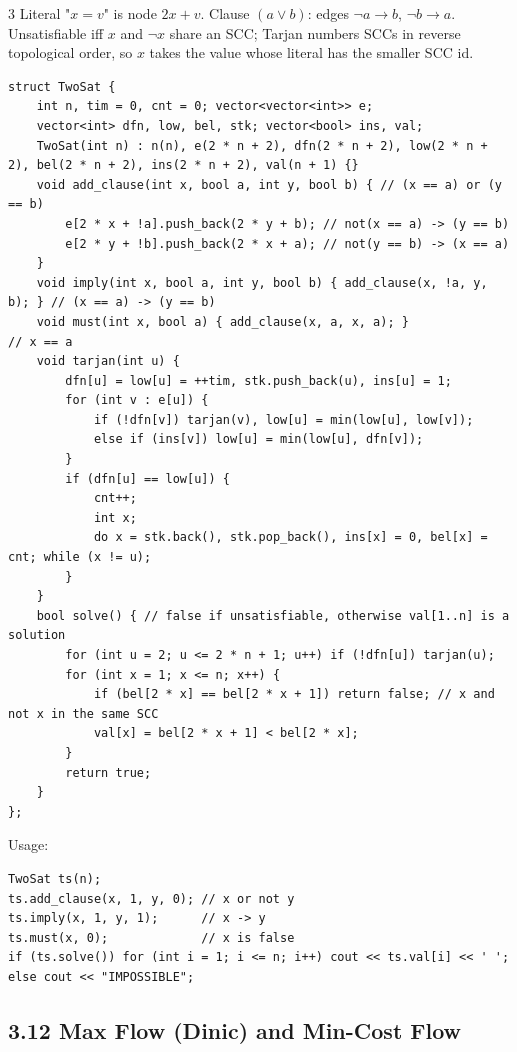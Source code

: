 \documentclass[8pt]{extarticle}
\begin{document}
\begin{multicols*}{3}
Literal "$x = v$" is node $2x + v$. Clause $(a \lor b)$: edges $\neg a \to b$, $\neg b \to a$. Unsatisfiable iff $x$ and $\neg x$ share an SCC; Tarjan numbers SCCs in reverse topological order, so $x$ takes the value whose literal has the smaller SCC id.

\begin{lstlisting}
struct TwoSat {
    int n, tim = 0, cnt = 0; vector<vector<int>> e;
    vector<int> dfn, low, bel, stk; vector<bool> ins, val;
    TwoSat(int n) : n(n), e(2 * n + 2), dfn(2 * n + 2), low(2 * n + 2), bel(2 * n + 2), ins(2 * n + 2), val(n + 1) {}
    void add_clause(int x, bool a, int y, bool b) { // (x == a) or (y == b)
        e[2 * x + !a].push_back(2 * y + b); // not(x == a) -> (y == b)
        e[2 * y + !b].push_back(2 * x + a); // not(y == b) -> (x == a)
    }
    void imply(int x, bool a, int y, bool b) { add_clause(x, !a, y, b); } // (x == a) -> (y == b)
    void must(int x, bool a) { add_clause(x, a, x, a); }                  // x == a
    void tarjan(int u) {
        dfn[u] = low[u] = ++tim, stk.push_back(u), ins[u] = 1;
        for (int v : e[u]) {
            if (!dfn[v]) tarjan(v), low[u] = min(low[u], low[v]);
            else if (ins[v]) low[u] = min(low[u], dfn[v]);
        }
        if (dfn[u] == low[u]) {
            cnt++;
            int x;
            do x = stk.back(), stk.pop_back(), ins[x] = 0, bel[x] = cnt; while (x != u);
        }
    }
    bool solve() { // false if unsatisfiable, otherwise val[1..n] is a solution
        for (int u = 2; u <= 2 * n + 1; u++) if (!dfn[u]) tarjan(u);
        for (int x = 1; x <= n; x++) {
            if (bel[2 * x] == bel[2 * x + 1]) return false; // x and not x in the same SCC
            val[x] = bel[2 * x + 1] < bel[2 * x];
        }
        return true;
    }
};
\end{lstlisting}

Usage:

\begin{lstlisting}
TwoSat ts(n);
ts.add_clause(x, 1, y, 0); // x or not y
ts.imply(x, 1, y, 1);      // x -> y
ts.must(x, 0);             // x is false
if (ts.solve()) for (int i = 1; i <= n; i++) cout << ts.val[i] << ' ';
else cout << "IMPOSSIBLE";
\end{lstlisting}

\subsection*{3.12 Max Flow (Dinic) and Min-Cost Flow}


\end{multicols*}
\end{document}
